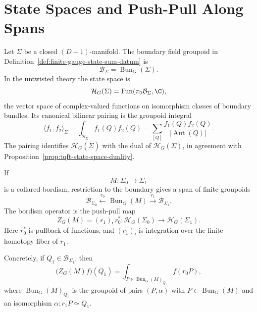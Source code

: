\section{State Spaces and Push-Pull Along Spans}

Let \(\Sigma\) be a closed \((D-1)\)-manifold.  The boundary field groupoid in
Definition~\ref{def:finite-gauge-state-sum-datum} is
\[
  \mathcal B_\Sigma=\operatorname{Bun}_G(\Sigma).
\]
In the untwisted theory the state space is
\begin{equation}
  \mathcal H_G(\Sigma)
  =
  \operatorname{Fun}(\pi_0\mathcal B_\Sigma,\C),
  \label{eq:finite-gauge-state-space}
\end{equation}
the vector space of complex-valued functions on isomorphism classes of
boundary bundles.  Its canonical bilinear pairing is the groupoid integral
\begin{equation}
  \langle f_1,f_2\rangle_\Sigma
  =
  \int_{\mathcal B_\Sigma} f_1(Q)f_2(Q)
  =
  \sum_{[Q]}
  \frac{f_1(Q)f_2(Q)}{|\operatorname{Aut}(Q)|}.
  \label{eq:finite-gauge-boundary-pairing}
\end{equation}
The pairing identifies \(\mathcal H_G(\bar\Sigma)\) with the dual of
\(\mathcal H_G(\Sigma)\), in agreement with
Proposition~\ref{prop:tqft-state-space-duality}.

If
\[
  M:\Sigma_0\to\Sigma_1
\]
is a collared bordism, restriction to the boundary gives a span of finite
groupoids
\begin{equation}
  \mathcal B_{\Sigma_0}
  \xleftarrow{\ r_0\ }
  \operatorname{Bun}_G(M)
  \xrightarrow{\ r_1\ }
  \mathcal B_{\Sigma_1}.
  \label{eq:finite-gauge-bordism-span}
\end{equation}
The bordism operator is the push-pull map
\begin{equation}
  Z_G(M)
  =
  (r_1)_!\,r_0^*
  :
  \mathcal H_G(\Sigma_0)\to\mathcal H_G(\Sigma_1).
  \label{eq:finite-gauge-push-pull}
\end{equation}
Here \(r_0^*\) is pullback of functions, and \((r_1)_!\) is integration over
the finite homotopy fiber of \(r_1\).

Concretely, if \(Q_1\in\mathcal B_{\Sigma_1}\), then
\begin{equation}
  \bigl(Z_G(M)f\bigr)(Q_1)
  =
  \int_{P\in\operatorname{Bun}_G(M)_{Q_1}}
  f(r_0P),
  \label{eq:finite-gauge-pushforward-concrete}
\end{equation}
where \(\operatorname{Bun}_G(M)_{Q_1}\) is the groupoid of pairs
\((P,\alpha)\) with \(P\in\operatorname{Bun}_G(M)\) and an isomorphism
\(\alpha:r_1P\simeq Q_1\).

